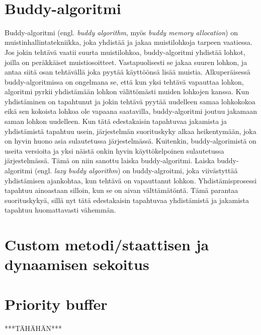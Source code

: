 ~\\

\section{Buddy-algoritmi}

Buddy-algoritmi (engl. \textit{buddy algorithm}, myös \textit{buddy memory allocation}) on muistinhallintatekniikka, joka yhdistää ja jakaa muistilohkoja tarpeen vaatiessa. Jos jokin tehtävä vaatii suurta muistilohkoa, buddy-algoritmi yhdistää lohkot, joilla on peräkkäiset muistiosoitteet. Vastapuolisesti se jakaa suuren lohkon, ja antaa siitä osan tehtävällä joka pyytää käyttöönsä lisää muistia. Alkuperäisessä buddy-algoritmissa on ongelmana se, että kun yksi tehtävä vapauttaa lohkon, algoritmi pyrkii yhdistämään lohkon välittömästi muiden lohkojen kanssa. Kun yhdistäminen on tapahtunut ja jokin tehtävä pyytää uudelleen samaa lohkokokoa eikä sen kokoista lohkoa ole vapaana saatavilla, buddy-algoritmi joutuu jakamaan saman lohkon uudelleen. Kun tätä edestakaisin tapahtuvaa jakamista ja yhdistämistä tapahtuu usein, järjestelmän suorituskyky alkaa heikentymään, joka on hyvin huono asia sulautetussa järjestelmässä. Kuitenkin, buddy-algorimistä on useita versioita ja yksi näistä onkin hyvin käyttökelpoinen sulautetussa järjestelmässä. Tämä on niin sanottu laiska buddy-algoritmi. Laiska buddy-algoritmi (engl. \textit{lazy buddy algorithm}) on buddy-algroitmi, joka viivästyttää yhdistämisen ajankohtaa, kun tehtävä on vapauttanut lohkon. Yhdistämisprosessi tapahtuu ainoastaan silloin, kun se on aivan välttämätöntä. Tämä parantaa suorituskykyä, sillä nyt tätä edestakaisin tapahtuvaa yhdistämistä ja jakamista tapahtuu huomattavasti vähemmän.\cite{soeosmm@2009}



\section{Custom metodi/staattisen ja dynaamisen sekoitus}
\section{Priority buffer}

***TÄHÄHÄN***